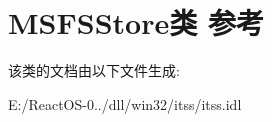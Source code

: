 \hypertarget{class_m_s_f_s_store}{}\section{M\+S\+F\+S\+Store类 参考}
\label{class_m_s_f_s_store}


该类的文档由以下文件生成\+:\begin{DoxyCompactItemize}
\item 
E\+:/\+React\+O\+S-\/0../dll/win32/itss/itss.\+idl\end{DoxyCompactItemize}
